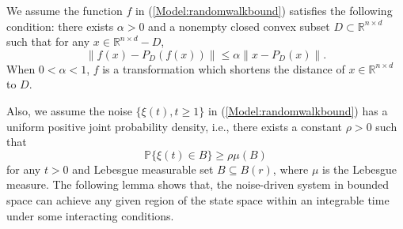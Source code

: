 \documentclass[11pt]{article}
\theoremstyle{definition}
\theoremstyle{remark}
\numberwithin{equation}{section}
\begin{document}

We assume the function $f$ in (\ref{Model:randomwalkbound}) satisfies the following condition:
there exists $\alpha>0$ and a nonempty closed convex subset $D\subset \mathbb{R}^{n\times d}$ such that for any $x\in \mathbb{R}^{n\times d}-D$,
\begin{equation}\label{Condition:f}
\| f(x)-P_D(f(x))\|\leq \alpha \| x-P_D(x)\|.
\end{equation}
When $0<\alpha< 1$, $f$ is a transformation which shortens the distance of $x\in\mathbb{R}^{n\times d}$ to $D$.


Also, we assume the noise $\{\xi(t), t\geq 1\}$ in (\ref{Model:randomwalkbound}) has a uniform positive joint probability density, i.e., there exists a constant $\rho>0$ such that
\begin{equation}\label{prodensi}
  \mathbb{P}\{\xi(t)\in B\}\geq \rho \mu(B)
\end{equation}
for any $t>0$ and Lebesgue measurable set $B\subseteq B(r)$,  where $\mu$ is the Lebesgue measure.
The following lemma shows that, the noise-driven system in bounded space can achieve any given region of the state space within an integrable time under some interacting conditions.
\end{document}
